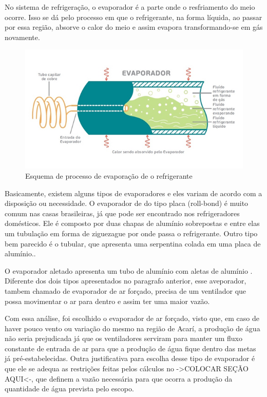 No sistema de refrigeração, o evaporador é a parte onde o resfriamento do meio ocorre. Isso se dá pelo processo em que o refrigerante, na forma líquida, ao passar por essa região, absorve o calor do meio e assim evapora transformando-se em gás novamente. 
\begin{figure}[!htbp]
	 \centering
	  \includegraphics[scale=1]{editaveis/figuras/evaporador}
	  \caption[Esquema de processo de evaporação de o refrigerante]{Esquema de processo de evaporação de o refrigerante\footnotemark}
	  \label{condensador}
	\end{figure}	   
	\FloatBarrier
	
	
Basicamente, existem alguns tipos de evaporadores e eles variam de acordo com a disposição ou necessidade. O evaporador de do tipo placa (roll-bond) é muito comum nas casas brasileiras, já que pode ser encontrado nos refrigeradores domésticos. Ele é composto por duas chapas de alumínio sobrepostas e entre elas um tubulação em forma de ziguezague por onde passa o refrigerante. Outro tipo bem parecido é o tubular, que apresenta uma serpentina colada em uma placa de alumínio.\cite{embracocolecao}.

O evaporador aletado apresenta um tubo de alumínio com aletas de alumínio \cite{embracocolecao}. Diferente dos dois tipos apresentados no paragrafo anterior, esse aveporador, tambem chamado de evaporador de ar forçado, precisa de um ventilador que possa movimentar o ar para dentro e assim ter uma maior vazão. 

Com essa análise, foi escolhido o evaporador de ar forçado, visto que, em caso de haver pouco vento ou variação do mesmo na região de Acarí, a produção de água não seria prejudicada já que os ventiladores serviram para manter um fluxo constante de entrada de ar para que a produção de água fique dentro das metas já pré-estabelecidas. 
Outra justificativa para escolha desse tipo de evaporador é que ele se adequa as restrições feitas pelos cálculos no ->COLOCAR SEÇÃO AQUI<-, que definem a vazão necessária para que ocorra a produção da quantidade de água prevista pelo escopo.

